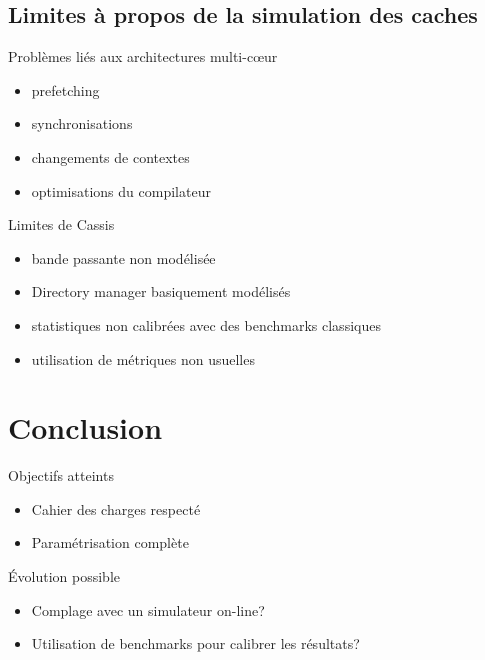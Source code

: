 \subsection{Limites \`a  propos de la simulation des caches}
\begin{frame}
  \begin{block}{Probl\`emes li\'es aux architectures multi-c{\oe}ur}
    \begin{itemize}
      \item \textsf{prefetching}
      \item synchronisations
      \item changements de contextes 
      \item optimisations du compilateur
    \end{itemize}
  \end{block}
  \begin{block}{Limites de \textsf{Cassis}}
    \begin{itemize}
      \item bande passante non mod\'elis\'ee
      \item \textsf{Directory manager} basiquement mod\'elis\'es
      \item statistiques non calibr\'ees avec des benchmarks classiques
      \item utilisation de m\'etriques non usuelles
    \end{itemize}
  \end{block}
\end{frame}


\section*{Conclusion}
\begin{frame}
  \begin{block}{Objectifs atteints}
    \begin{itemize}
      \item Cahier des charges respect\'e
      \item Param\'etrisation compl\`ete
    \end{itemize}
  \end{block}

  \begin{block}{\'Evolution possible}
    \begin{itemize}
      \item Complage avec un simulateur \textsf{on-line}?
      \item Utilisation de benchmarks pour calibrer les r\'esultats?
    \end{itemize}
  \end{block}
\end{frame}
